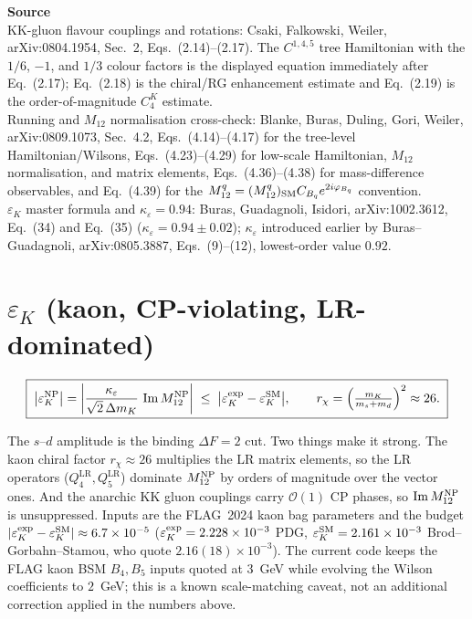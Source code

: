 \documentclass[11pt]{article}
\newcommand{\Mtwelve}{M_{12}}
\newcommand{\eps}{\varepsilon}
\newcommand{\dmk}{\Delta m_K}
\newcommand{\QLRfour}{Q_4^{\mathrm{LR}}}
\newcommand{\QLRfive}{Q_5^{\mathrm{LR}}}
\newcommand{\epsK}{\varepsilon_K}
\newenvironment{srcbox}{\begin{srcboxframe}\small\raggedright\sloppy}{\end{srcboxframe}}
\begin{document}
\begin{srcbox}
\textbf{Source}\\[2pt]
KK-gluon flavour couplings and rotations: Csaki, Falkowski, Weiler,
arXiv:0804.1954, Sec.~2, Eqs.~(2.14)--(2.17). The $C^{1,4,5}$ tree Hamiltonian
with the $1/6$, $-1$, and $1/3$ colour factors is the displayed equation
immediately after Eq.~(2.17); Eq.~(2.18) is the chiral/RG enhancement estimate
and Eq.~(2.19) is the order-of-magnitude $C_4^K$ estimate.\\[2pt]
Running and $M_{12}$ normalisation cross-check: Blanke, Buras, Duling, Gori,
Weiler, arXiv:0809.1073, Sec.~4.2, Eqs.~(4.14)--(4.17) for the tree-level
Hamiltonian/Wilsons, Eqs.~(4.23)--(4.29) for low-scale Hamiltonian,
$M_{12}$ normalisation, and matrix elements, Eqs.~(4.36)--(4.38) for
mass-difference observables, and Eq.~(4.39) for the
$M_{12}^q=(M_{12}^q)_{\rm SM}C_{B_q}e^{2i\varphi_{B_q}}$ convention.\\[2pt]
$\epsK$ master formula
and $\kappa_\eps=0.94$: Buras, Guadagnoli, Isidori, arXiv:1002.3612, Eq.~(34) and
Eq.~(35) ($\kappa_\eps=0.94\pm0.02$); $\kappa_\eps$ introduced earlier by
Buras--Guadagnoli, arXiv:0805.3887, Eqs.~(9)--(12), lowest-order value $0.92$.
\end{srcbox}

\bigskip
\section*{$\varepsilon_K$ (kaon, CP-violating, LR-dominated)}

\begin{equation}
\boxed{\;
\big|\epsK^{\rm NP}\big|
=\left|\frac{\kappa_\eps}{\sqrt2\,\dmk}\,\operatorname{Im}\Mtwelve^{\rm NP}\right|
\;\le\; \big|\epsK^{\rm exp}-\epsK^{\rm SM}\big|,
\qquad
r_\chi=\Big(\tfrac{m_K}{m_s+m_d}\Big)^2\approx 26.
\;}
\end{equation}

\noindent The $s$--$d$ amplitude is the binding $\Delta F=2$ cut. Two things make
it strong. The kaon chiral factor $r_\chi\approx26$ multiplies the LR matrix
elements, so the LR operators ($\QLRfour,\QLRfive$) dominate $\Mtwelve^{\rm NP}$ by
orders of magnitude over the vector ones. And the anarchic KK gluon couplings carry
$\mathcal{O}(1)$ CP phases, so $\operatorname{Im}\Mtwelve^{\rm NP}$ is unsuppressed.
Inputs are the FLAG~2024 kaon bag parameters and the budget
$|\epsK^{\rm exp}-\epsK^{\rm SM}|\approx6.7\times10^{-5}$
($\epsK^{\rm exp}=2.228\times10^{-3}$ PDG, $\epsK^{\rm SM}=2.161\times10^{-3}$
Brod--Gorbahn--Stamou, who quote $2.16(18)\times10^{-3}$). The current code keeps the FLAG kaon BSM
$B_4,B_5$ inputs quoted at $3$~GeV while evolving the Wilson coefficients to
$2$~GeV; this is a known scale-matching caveat, not an additional correction
applied in the numbers above.
\end{document}
